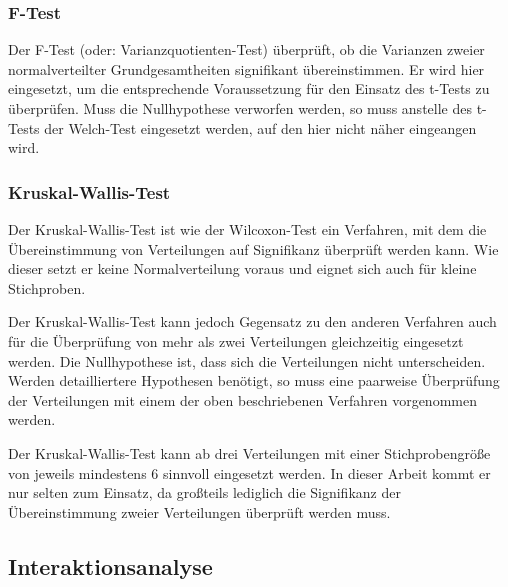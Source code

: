 
\subsubsection{F-Test} %
\label{ssub:f_test}

Der F-Test (oder: Varianzquotienten-Test) überprüft, ob die Varianzen zweier normalverteilter Grundgesamtheiten signifikant übereinstimmen. Er wird hier eingesetzt, um die entsprechende Voraussetzung für den Einsatz des t-Tests zu überprüfen. Muss die Nullhypothese verworfen werden, so muss anstelle des t-Tests der Welch-Test eingesetzt werden, auf den hier nicht näher eingeangen wird.


\subsubsection{Kruskal-Wallis-Test} %
\label{ssub:kruskal_wallis_test}

Der Kruskal-Wallis-Test ist wie der Wilcoxon-Test ein Verfahren, mit dem die Übereinstimmung von Verteilungen auf Signifikanz überprüft werden kann. Wie dieser setzt er keine Normalverteilung voraus und eignet sich auch für kleine Stichproben. 

Der Kruskal-Wallis-Test kann jedoch Gegensatz zu den anderen Verfahren auch für die Überprüfung von mehr als zwei Verteilungen gleichzeitig eingesetzt werden. Die Nullhypothese ist, dass sich die Verteilungen nicht unterscheiden. Werden detailliertere Hypothesen benötigt, so muss eine paarweise Überprüfung der Verteilungen mit einem der oben beschriebenen Verfahren vorgenommen werden.

Der Kruskal-Wallis-Test kann ab drei Verteilungen mit einer Stichprobengröße von jeweils mindestens 6 sinnvoll eingesetzt werden. In dieser Arbeit kommt er nur selten zum Einsatz, da großteils lediglich die Signifikanz der Übereinstimmung zweier Verteilungen überprüft werden muss.



\subsection{Interaktionsanalyse} %
\label{sub:interaktionsanalyse}

